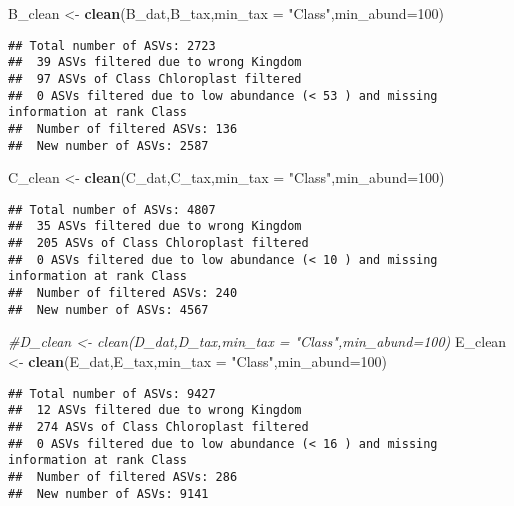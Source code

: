 \documentclass[
]{article}
\newenvironment{Shaded}{\begin{snugshade}}{\end{snugshade}}
\newcommand{\CommentTok}[1]{\textcolor[rgb]{0.56,0.35,0.01}{\textit{#1}}}
\newcommand{\DataTypeTok}[1]{\textcolor[rgb]{0.13,0.29,0.53}{#1}}
\newcommand{\DecValTok}[1]{\textcolor[rgb]{0.00,0.00,0.81}{#1}}
\newcommand{\KeywordTok}[1]{\textcolor[rgb]{0.13,0.29,0.53}{\textbf{#1}}}
\newcommand{\NormalTok}[1]{#1}
\newcommand{\StringTok}[1]{\textcolor[rgb]{0.31,0.60,0.02}{#1}}
\begin{document}
\begin{Shaded}
\begin{Highlighting}[]
\NormalTok{B_clean <-}\StringTok{ }\KeywordTok{clean}\NormalTok{(B_dat,B_tax,}\DataTypeTok{min_tax =} \StringTok{"Class"}\NormalTok{,}\DataTypeTok{min_abund=}\DecValTok{100}\NormalTok{)}
\end{Highlighting}
\end{Shaded}

\begin{verbatim}
## Total number of ASVs: 2723 
##  39 ASVs filtered due to wrong Kingdom
##  97 ASVs of Class Chloroplast filtered
##  0 ASVs filtered due to low abundance (< 53 ) and missing information at rank Class 
##  Number of filtered ASVs: 136 
##  New number of ASVs: 2587
\end{verbatim}

\begin{Shaded}
\begin{Highlighting}[]
\NormalTok{C_clean <-}\StringTok{ }\KeywordTok{clean}\NormalTok{(C_dat,C_tax,}\DataTypeTok{min_tax =} \StringTok{"Class"}\NormalTok{,}\DataTypeTok{min_abund=}\DecValTok{100}\NormalTok{)}
\end{Highlighting}
\end{Shaded}

\begin{verbatim}
## Total number of ASVs: 4807 
##  35 ASVs filtered due to wrong Kingdom
##  205 ASVs of Class Chloroplast filtered
##  0 ASVs filtered due to low abundance (< 10 ) and missing information at rank Class 
##  Number of filtered ASVs: 240 
##  New number of ASVs: 4567
\end{verbatim}

\begin{Shaded}
\begin{Highlighting}[]
\CommentTok{#D_clean <- clean(D_dat,D_tax,min_tax = "Class",min_abund=100)}
\NormalTok{E_clean <-}\StringTok{ }\KeywordTok{clean}\NormalTok{(E_dat,E_tax,}\DataTypeTok{min_tax =} \StringTok{"Class"}\NormalTok{,}\DataTypeTok{min_abund=}\DecValTok{100}\NormalTok{)}
\end{Highlighting}
\end{Shaded}

\begin{verbatim}
## Total number of ASVs: 9427 
##  12 ASVs filtered due to wrong Kingdom
##  274 ASVs of Class Chloroplast filtered
##  0 ASVs filtered due to low abundance (< 16 ) and missing information at rank Class 
##  Number of filtered ASVs: 286 
##  New number of ASVs: 9141
\end{verbatim}
\end{document}
